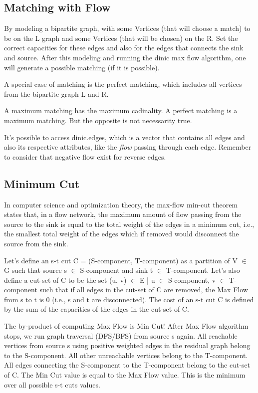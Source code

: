 	\subsection{Matching with Flow}

By modeling a bipartite graph, with some Vertices (that will choose a match) 
to be on the L graph and some Vertices (that will be chosen) on the R.
Set the correct capacities for these edges and also for the edges that connects the sink and source. After this modeling
and running the dinic max flow algorithm, one will generate a possible matching (if it is possible).

A special case of matching is the perfect matching, which includes all vertices from the bipartite graph L and R.

A maximum matching has the maximum cadinality. A perfect matching is a maximum matching. 
But the opposite is not necessarity true.

It's possible to access dinic.edges, which is a vector that contains all edges and also its respective attributes, 
like the \textit{flow} passing through each edge. Remember to consider that negative flow exist for reverse edges.

\subsection{Minimum Cut}

In computer science and optimization theory, the max-flow min-cut theorem states that, in a flow network, 
the maximum amount of flow passing from the source to the sink is equal to the total weight of the edges 
in a minimum cut, i.e., the smallest total weight of the edges which if removed would disconnect the source from the sink. 

Let's define an s-t cut C = (S-component, T-component) as a partition of V $\in$ G such that 
source s $\in$ S-component and sink t $\in$ T-component. Let's also define a cut-set of C to be the set 
(u, v) $\in$ E | u $\in$ S-component, v $\in$ T-component such that if all edges in the cut-set of C are removed,
the Max Flow from s to t is 0 (i.e., s and t are disconnected). The cost of an s-t cut C is defined by the sum
of the capacities of the edges in the cut-set of C.

The by-product of computing Max Flow is Min Cut! After Max Flow algorithm stops, we run graph traversal (DFS/BFS)
from source s again. All reachable vertices from source s using positive weighted edges in the residual graph belong
to the S-component. All other unreachable vertices belong to the T-component. All edges connecting the S-component to
the T-component belong to the cut-set of C. The Min Cut value is equal to the Max Flow value.
This is the minimum over all possible s-t cuts values.

